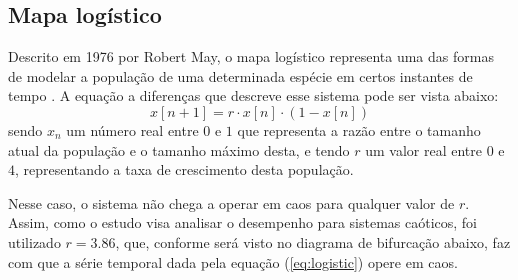 \documentclass[a4paper, 12pt]{article}
\begin{document}
\subsection{Mapa logístico}

Descrito em 1976 por Robert May, o mapa logístico representa uma das formas de modelar a população de uma determinada espécie em certos instantes de tempo \cite{may1976simple}. A equação a diferenças que descreve esse sistema pode ser vista abaixo:
\begin{equation}\label{eq:logistic}
x[n+1] = r\cdot x[n] \cdot (1 - x[n])
\end{equation}
sendo $x_n$ um número real entre $0$ e $1$ que representa a razão entre o tamanho atual da população e o tamanho máximo desta, e tendo $r$ um valor real entre $0$ e $4$, representando a taxa de crescimento desta população.

Nesse caso, o sistema não chega a operar em caos para qualquer valor de $r$. Assim, como o estudo visa analisar o desempenho para sistemas caóticos, foi utilizado $r=3.86$, que, conforme será visto no diagrama de bifurcação abaixo, faz com que a série temporal dada pela equação (\ref{eq:logistic}) opere em caos. 
\end{document}
